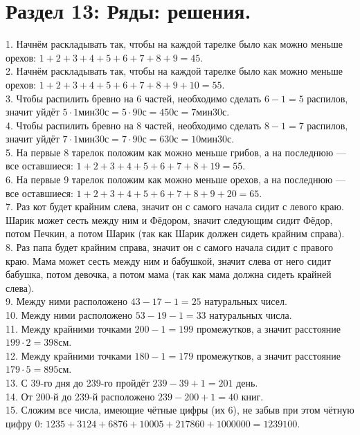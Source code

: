 \documentclass[12pt]{article}
\begin{document}
\section{Раздел 13: Ряды: решения.}
1. Начнём раскладывать так, чтобы на каждой тарелке было как можно меньше орехов: $1+2+3+4+5+6+7+8+9=45.$\\
2. Начнём раскладывать так, чтобы на каждой тарелке было как можно меньше орехов: $1+2+3+4+5+6+7+8+9+10=55.$\\
3. Чтобы распилить бревно на 6 частей, необходимо сделать $6-1=5$ распилов, значит уйдёт $5\cdot1\text{мин}30\text{с}=5\cdot90\text{с}=450\text{с}=7\text{мин}30\text{с}.$\\
4. Чтобы распилить бревно на 8 частей, необходимо сделать $8-1=7$ распилов, значит уйдёт $7\cdot1\text{мин}30\text{с}=7\cdot90\text{с}=630\text{с}=10\text{мин}30\text{с}.$\\
5. На первые 8 тарелок положим как можно меньше грибов, а на последнюю --- все оставшиеся: $1+2+3+4+5+6+7+8+19=55.$\\
6. На первые 9 тарелок положим как можно меньше орехов, а на последнюю --- все оставшиеся: $1+2+3+4+5+6+7+8+9+20=65.$\\
7. Раз кот будет крайним слева, значит он с самого начала сидит с левого краю. Шарик может сесть между ним и Фёдором, значит следующим сидит Фёдор, потом Печкин, а потом Шарик (так как Шарик должен сидеть крайним справа).\\
8. Раз папа будет крайним справа, значит он с самого начала сидит с правого краю. Мама может сесть между ним и бабушкой, значит слева от него сидит бабушка, потом девочка, а потом мама (так как мама должна сидеть крайней слева).\\
9. Между ними расположено $43-17-1=25$ натуральных чисел.\\
10. Между ними расположено $53-19-1=33$ натуральных числа.\\
11. Между крайними точками $200-1=199$ промежутков, а значит расстояние $199\cdot2=398$см.\\
12. Между крайними точками $180-1=179$ промежутков, а значит расстояние $179\cdot5=895$см.\\
13. С 39-го дня до 239-го пройдёт $239-39+1=201$ день.\\
14. От 200-й до 239-й расположено $239-200+1=40$ книг.\\
15. Сложим все числа, имеющие чётные цифры (их 6), не забыв при этом чётную цифру 0: $1235+3124+6876+10005+217860+1000000=1239100.$\\
\end{document}
